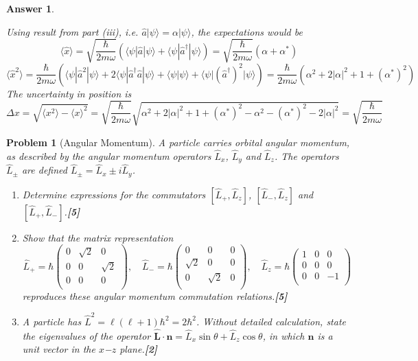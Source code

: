 \documentclass[a4paper]{article}
\newtheorem{ans}{Answer}[subsection]
\theoremstyle{new}
\newtheorem{qns}{Problem}[subsection]
\begin{document}
\begin{ans}
\begin{enumerate}[label=(\roman*)]
Using result from part (iii), i.e. $\hat{a}|\psi\rangle=\alpha|\psi\rangle$, the expectations would be
$$\langle\hat{x}\rangle=\sqrt{\frac{\hbar}{2m\omega}}(\langle\psi|\hat{a}|\psi\rangle+\langle\psi|\hat{a}^\dag|\psi\rangle)=\sqrt{\frac{\hbar}{2m\omega}}(\alpha+\alpha^*)$$
$$\langle\hat{x}^2\rangle=\frac{\hbar}{2m\omega}(\langle\psi|\hat{a}^2|\psi\rangle+2\langle\psi|\hat{a}^\dag\hat{a}|\psi\rangle+\langle\psi|\psi\rangle+\langle\psi|(\hat{a}^\dag)^2|\psi\rangle)=\frac{\hbar}{2m\omega}(\alpha^2+2|\alpha|^2+1+(\alpha^*)^2)$$
The uncertainty in position is
$$\Delta x=\sqrt{\langle x^2\rangle
-\langle x\rangle^2}=\sqrt{\frac{\hbar}{2m\omega}}\sqrt{\alpha^2+2|\alpha|^2+1+(\alpha^*)^2-\alpha^2-(\alpha^*)^2-2|\alpha|^2}=\sqrt{\frac{\hbar}{2m\omega}}$$
\end{enumerate}
\end{ans}
\begin{qns}[Angular Momentum]
A particle carries orbital angular momentum, as described by the angular momentum operators $\hat{L}_x$, $\hat{L}_y$ and $\hat{L}_z$. The operators $\hat{L}_\pm$ are defined $\hat{L}_\pm=\hat{L}_x\pm i\hat{L}_y$.
\begin{enumerate}[label=(\roman*)]
\item Determine expressions for the commutators $[\hat{L}_+,\hat{L}_z]$, $[\hat{L}_-,\hat{L}_z]$ and $[\hat{L}_+,\hat{L}_-]$.\hfill\textbf{[5]}
\item Show that the matrix representation
$$\hat{L}_+=\hbar\begin{pmatrix}0&\sqrt{2}&0\\0&0&\sqrt{2}\\0&0&0\\\end{pmatrix},\quad \hat{L}_-=\hbar\begin{pmatrix}0&0&0\\\sqrt{2}&0&0\\0&\sqrt{2}&0\\\end{pmatrix},\quad \hat{L}_z=\hbar\begin{pmatrix}1&0&0\\0&0&0\\0&0&-1\\\end{pmatrix}$$
reproduces these angular momentum commutation relations.\hfill\textbf{[5]}
\item A particle has $\hat{L}^2=\ell(\ell+1)\hbar^2=2\hbar^2$. Without detailed calculation, state the eigenvalues of the operator $\hat{\mathbf{L}}\cdot\mathbf{n}=\hat{L}_x\sin\theta+\hat{L}_z\cos\theta$, in which $\mathbf{n}$ is a unit vector in the $x$−$z$ plane.\hfill\textbf{[2]}

\end{enumerate}
\end{qns}
\end{document}
